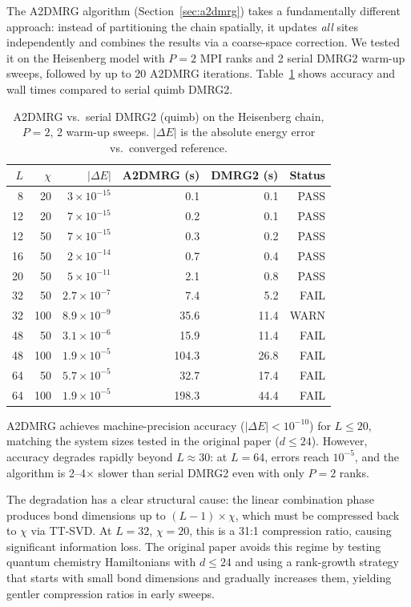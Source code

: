 \documentclass[preprint,12pt]{elsarticle}
\begin{document}
The A2DMRG algorithm (Section~\ref{sec:a2dmrg}) takes a fundamentally different approach: instead of partitioning the chain spatially, it updates \emph{all} sites independently and combines the results via a coarse-space correction.
We tested it on the Heisenberg model with $P = 2$ MPI ranks and 2 serial DMRG2 warm-up sweeps, followed by up to 20 A2DMRG iterations.
Table~\ref{tab:a2dmrg} shows accuracy and wall times compared to serial quimb DMRG2.

\begin{table}[h]
\centering
\caption{A2DMRG vs.\ serial DMRG2 (quimb) on the Heisenberg chain, $P = 2$, 2 warm-up sweeps.  $|\Delta E|$ is the absolute energy error vs.\ converged reference.}
\label{tab:a2dmrg}
\begin{tabular}{rrrrrr}
\toprule
$L$ & $\chi$ & $|\Delta E|$ & A2DMRG (s) & DMRG2 (s) & Status \\
\midrule
8  & 20  & $3 \times 10^{-15}$ & 0.1 & 0.1 & PASS \\
12 & 20  & $7 \times 10^{-15}$ & 0.2 & 0.1 & PASS \\
12 & 50  & $7 \times 10^{-15}$ & 0.3 & 0.2 & PASS \\
16 & 50  & $2 \times 10^{-14}$ & 0.7 & 0.4 & PASS \\
20 & 50  & $5 \times 10^{-11}$ & 2.1 & 0.8 & PASS \\
32 & 50  & $2.7 \times 10^{-7}$ & 7.4 & 5.2 & FAIL \\
32 & 100 & $8.9 \times 10^{-9}$ & 35.6 & 11.4 & WARN \\
48 & 50  & $3.1 \times 10^{-6}$ & 15.9 & 11.4 & FAIL \\
48 & 100 & $1.9 \times 10^{-5}$ & 104.3 & 26.8 & FAIL \\
64 & 50  & $5.7 \times 10^{-5}$ & 32.7 & 17.4 & FAIL \\
64 & 100 & $1.9 \times 10^{-5}$ & 198.3 & 44.4 & FAIL \\
\bottomrule
\end{tabular}
\end{table}

A2DMRG achieves machine-precision accuracy ($|\Delta E| < 10^{-10}$) for $L \leq 20$, matching the system sizes tested in the original paper \cite{Grigori2025} ($d \leq 24$).
However, accuracy degrades rapidly beyond $L \approx 30$: at $L = 64$, errors reach $10^{-5}$, and the algorithm is 2--4$\times$ slower than serial DMRG2 even with only $P = 2$ ranks.

The degradation has a clear structural cause: the linear combination phase produces bond dimensions up to $(L-1) \times \chi$, which must be compressed back to $\chi$ via TT-SVD.
At $L = 32$, $\chi = 20$, this is a 31:1 compression ratio, causing significant information loss.
The original paper avoids this regime by testing quantum chemistry Hamiltonians with $d \leq 24$ and using a rank-growth strategy that starts with small bond dimensions and gradually increases them, yielding gentler compression ratios in early sweeps.
\end{document}
